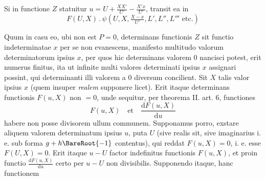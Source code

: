 Si in functione $Z$ statuitur $u=U+\frac{XX'}{U'}-\frac{X'x}{U'}$, transit ea in
\[
F(U,X)\, .\,\psi(U,X,\tfrac{X-x}{U'},L',L'',L'''\text{ etc.})
\]

Quum in casu eo, ubi non est $P=0$, determinans functionis $Z$ sit
functio indeterminatae $x$ per se non evanescens, manifesto multitudo valorum determinatorum ipsius $x$, per quos hic determinans valorem 0 nancisci potest, erit
numerus finitus, ita ut infinite multi valores determinati ipsius $x$ assignari possint, qui determinanti illi valorem a 0 diversum concilient. Sit $X$ talis valor
ipsius $x$ (quem insuper \textit{realem} supponere licet). Erit itaque determinans functionis $F(u,X)$ non $=0$, unde sequitur, per theorema II. art. 6, functiones
\[
F(u,X)\quad\text{et}\quad\frac{\mathrm dF(u,X)}{\mathrm du}
\]
habere non posse divisorem ullum communem. Supponamus porro, exstare aliquem
valorem determinatum ipsius $u$, puta $U$ (sive realis sit, sive imaginarius i. e. sub
forma $g+h\BareRoot{-1}$ contentus), qui reddat $F(u,X)=0$, i. e. esse $F(U,X)=0$.
Erit itaque $u-U$ factor indefinitus functionis $F(u,X)$, et proin functio
$\frac{\mathrm dF(u,X)}{\mathrm du}$ certo per $u-U$ non divisibilis. Supponendo itaque, hanc functionem

